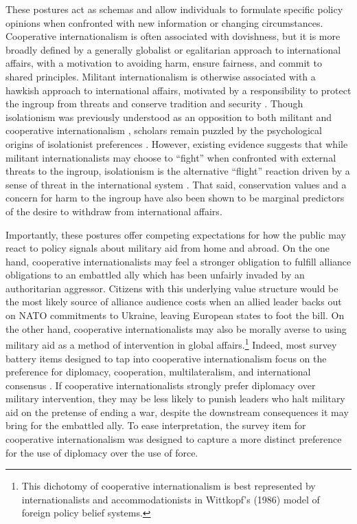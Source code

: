 \begin{appendices}
These postures act as schemas and allow individuals to formulate specific policy opinions when confronted with new information or changing circumstances. Cooperative internationalism is often associated with dovishness, but it is more broadly defined by a generally globalist or egalitarian approach to international affairs, with a motivation to avoiding harm, ensure fairness, and commit to shared principles. Militant internationalism is otherwise associated with a hawkish approach to international affairs, motivated by a responsibility to protect the ingroup from threats and conserve tradition and security \autocite{rathbun_towards_2020}. Though isolationism was previously understood as an opposition to both militant and cooperative internationalism \autocite{wittkopf_foreign_1986}, scholars remain puzzled by the psychological origins of isolationist preferences \autocite{rathbun_towards_2020}. However, existing evidence suggests that while militant internationalists may choose to \enquote{fight} when confronted with external threats to the ingroup, isolationism is the alternative \enquote{flight} reaction driven by a sense of threat in the international system \autocite{kertzer_making_2013}. That said, conservation values and a concern for harm to the ingroup have also been shown to be marginal predictors of the desire to withdraw from international affairs\autocite{rathbun_taking_2016}.

Importantly, these postures offer competing expectations for how the public may react to policy signals about military aid from home and abroad. On the one hand, cooperative internationalists may feel a stronger obligation to fulfill alliance obligations to an embattled ally which has been unfairly invaded by an authoritarian aggressor. Citizens with this underlying value structure would be the most likely source of alliance audience costs when an allied leader backs out on NATO commitments to Ukraine, leaving European states to foot the bill. On the other hand, cooperative internationalists may also be morally averse to using military aid as a method of intervention in global affairs.\footnote{This dichotomy of cooperative internationalism is best represented by internationalists and accommodationists in Wittkopf's (1986) model of foreign policy belief systems.} Indeed, most survey battery items designed to tap into cooperative internationalism focus on the preference for diplomacy, cooperation, multilateralism, and international consensus \autocite{gravelle_structure_2017}. If cooperative internationalists strongly prefer diplomacy over military intervention, they may be less likely to punish leaders who halt military aid on the pretense of ending a war, despite the downstream consequences it may bring for the embattled ally. To ease interpretation, the survey item for cooperative internationalism was designed to capture a more distinct preference for the use of diplomacy over the use of force.


\end{appendices}
